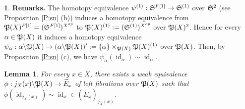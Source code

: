 \documentclass[12pt]{amsart}
\theoremstyle{plain}
\newtheorem{Lem}[Thm]{Lemma}
\theoremstyle{definition}
\newtheorem{Emp}[Thm]{}
\numberwithin{equation}{section}
\newcommand{\wt}{\widetilde}
\newcommand{\bs}{\backslash}
\newcommand{\al}{\alpha}
\newcommand{\rp}[1]{Proposition \ref{P:#1}}
\newcommand{\Map}{\operatorname{Map}}
\newcommand{\id}{\operatorname{id}}
\newcommand{\pr}{\operatorname{pr}}
\newcommand{\ev}{\operatorname{ev}}
\newcommand{\map}{\operatorname{map}}
\newcommand{\Hom}{\operatorname{Hom}}
\renewcommand{\S}{\frak{S}}
\renewcommand{\P}{\frak{P}}
\begin{document}
\begin{Emp} \label{E:notrem}
{\bf Remarks.} The homotopy equivalence $\psi^{(1)}:\S^{F[1]}\to
\S^{(1)}$ over $\S^2$ (see \rp{sn} (b)) induces a homotopy
equivalence from $\P(X)^{F[1]}=(\S^{F[1]})^{X^{op}}$ to
$\P(X)^{(1)}:=(\S^{(1)})^{X^{op}}$ over $\P(X)^2$. Hence for every
$\al\in \P(X)$ it induces a homotopy equivalence
$\psi_{\al}:\al\bs\P(X)\to
(\al\bs\P(X))':=\{\al\}\times_{\P(X)}\P(X)^{(1)}$ over $\P(X)$. Then, by
\rp{sn} (c),  we have $\psi_{\al}(\id_{\al})\sim\id_{\al}$. 

\end{Emp}







\begin{Lem} \label{L:equiv}
For every $x\in X$, there exists a weak equivalence
$\phi:j_X(x)\bs \P(X)\to \wt{E}_x$ of left fibrations over $\P(X)$
such that $\phi(\id_{j_X(x)})\sim\id_x\in (\wt{E}_x)_{j_X(x)}$.
\end{Lem}
\end{document}
